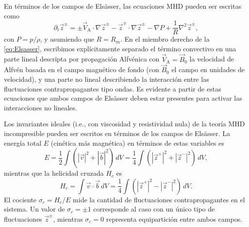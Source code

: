 En términos de los campos de Els\"asser, las ecuaciones MHD pueden ser
escritas \cite{servidio_time_2011} como
\begin{equation}
\partial_t \vec{z}^\pm  = \pm  \vec{V}_\textrm{A} \cdot \nabla \vec{z}^\pm  - 
\vec{z}^\mp \cdot \nabla \vec{z}^\pm - \nabla{P} + 
\frac{1}{R} \nabla^2 \vec{z}^\pm ,
\label{eq:Elsasser}
\end{equation}
con $P=p/\rho$, y asumiendo que $R=R_m$. En el miembro derecho de la
\cref{eq:Elsasser}, escribimos explícitamente separado el término
convectivo en una parte lineal descripta por propagación Alfvénica con
$\vec{V}_\textrm{A} = \vec{B}_0$ la velocidad de Alfvén basada en el
campo magnético de fondo (con $\vec{B}_0$ el campo en unidades de
velocidad), y una parte no lineal describiendo la interacción entre
las fluctuaciones contrapropagantes tipo ondas. Es evidente a partir
de estas ecuaciones que ambos campos de Els\"asser deben estar
presentes para activar las interacciones no lineales.

Los invariantes ideales (i.e., con viscosidad y resistividad nula) de la teoría MHD incompresible pueden ser escritos en términos de los campos de Els\"asser.
La energía total $E$ (cinética más magnética) en términos de estas variables es
\begin{equation}
E = \frac{1}{2}\int{\left(\left|\vec{v}\right|^2 +
    \left|\vec{b}\right|^2 \right)\,dV} =
    \frac{1}{4}\int{\left(\left|\vec{z}^+\right|^2 +
    \left|\vec{z}^-\right|^2 \right)\,dV},
\label{eq:ener}
\end{equation}
mientras que la helicidad cruzada $H_c$ es
\begin{equation}
H_c = \int{\vec{v}\cdot\vec{b} \, dV} =
    \frac{1}{4}\int{\left(\left|\vec{z}^+\right|^2 
    - \left|\vec{z}^-\right|^2 \right)\,dV} .
\label{eq:cross}
\end{equation}
El cociente $\sigma_c = H_c/E$ mide la cantidad de fluctuaciones
contrapropagantes en el sistema. Un valor de $\sigma_c = \pm 1$
corresponde al caso con un único tipo de fluctuaciones $\vec{z}^\pm$,
mientras $\sigma_c=0$ representa equipartición entre ambos campos.

